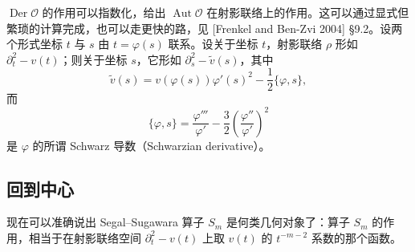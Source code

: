 
$\operatorname{Der}\mathcal{O}$ 的作用可以指数化，给出 $\operatorname{Aut}\mathcal{O}$ 在射影联络上的作用。这可以通过显式但繁琐的计算完成，也可以走更快的路，见 [Frenkel and Ben-Zvi 2004] §9.2。设两个形式坐标 $t$ 与 $s$ 由 $t=\varphi(s)$ 联系。设关于坐标 $t$，射影联络 $\rho$ 形如 $\partial_t^2-v(t)$；则关于坐标 $s$，它形如 $\partial_s^2-\tilde v(s)$，其中
\[
    \tilde v(s)=v(\varphi(s))\varphi'(s)^2-\frac12\{\varphi,s\},
\]
而
\begin{equation}
    \{\varphi,s\}=\frac{\varphi'''}{\varphi'}-\frac32\left(\frac{\varphi''}{\varphi'}\right)^2
    \tag{3.5-12}
\end{equation}
是 $\varphi$ 的所谓 Schwarz 导数（Schwarzian derivative）。


\subsection{回到中心}

现在可以准确说出 Segal–Sugawara 算子 $S_m$ 是何类几何对象了：算子 $S_m$ 的作用，相当于在射影联络空间 $\partial_t^2-v(t)$ 上取 $v(t)$ 的 $t^{-m-2}$ 系数的那个函数。

